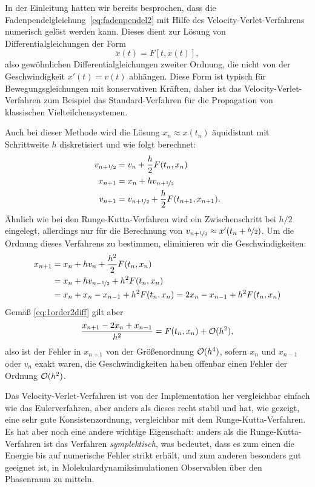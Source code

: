 In der Einleitung hatten wir bereits besprochen, dass die
Fadenpendelgleichung~\eqref{eq:fadenpendel2} mit Hilfe des
Velocity-Verlet-Verfahrens numerisch gelöst werden kann. Dieses dient
zur Lösung von Differentialgleichungen der Form
\begin{equation}
  \ddot x(t) = F[t, x(t)],
\end{equation}
also gewöhnlichen Differentialgleichungen zweiter Ordnung, die nicht
von der Geschwindigkeit $x'(t) = v(t)$ abhängen. Diese Form ist
typisch für Bewegungsgleichungen mit konservativen Kräften, daher ist
das Velocity-Verlet-Verfahren zum Beispiel das Standard-Verfahren für
die Propagation von klassischen Vielteilchensystemen.

Auch bei dieser Methode wird die Lösung $x_n\approx x(t_n)$
äquidistant mit Schrittweite $h$ diskretisiert und wie folgt
berechnet:
\begin{align}
  v_{n+\nicefrac{1}{2}} &= v_n + \frac{h}{2} F(t_n, x_n) \nonumber\\
  x_{n+1} &= x_n + h v_{n+\nicefrac{1}{2}} \\
  v_{n+1} &= v_{n+\nicefrac{1}{2}} + \frac{h}{2} F(t_{n+1}, x_{n+1}).\nonumber
\end{align}
Ähnlich wie bei den Runge-Kutta-Verfahren wird ein Zwischenschritt bei
$h/2$ eingelegt, allerdings nur für die Berechnung von
$v_{n+\nicefrac{1}{2}}\approx x'(t_n + \nicefrac{h}{2})$. Um die
Ordnung dieses Verfahrens zu bestimmen, eliminieren wir die
Geschwindigkeiten:
\begin{align}
  x_{n+1} &= x_n + h v_n + \frac{h^2}{2} F(t_n, x_n)\nonumber\\
  &=  x_n + h v_{n-\nicefrac{1}{2}} + h^2F(t_n, x_n)\nonumber\\
  &=  x_n + x_n - x_{n-1} + h^2F(t_n, x_n)
  =  2 x_n - x_{n-1} + h^2F(t_n, x_n)
\end{align}
Gemäß \eqref{eq:1order2diff} gilt aber
\begin{equation}
  \frac{x_{n+1}  - 2 x_n + x_{n-1}}{h^2} = F(t_n, x_n) + \mathcal O(h^2),
\end{equation}
also ist der Fehler in $x_{n+1}$ von der Größenordnung $\mathcal O(h^4)$,
sofern $x_n$ und $x_{n-1}$ oder $v_n$ exakt waren, die
Geschwindigkeiten haben offenbar einen Fehler der Ordnung $\mathcal O(h^2)$.

Das Velocity-Verlet-Verfahren ist von der Implementation her
vergleichbar einfach wie das Eulerverfahren, aber anders als dieses
recht stabil und hat, wie gezeigt, eine sehr gute Konsistenzordnung,
vergleichbar mit dem Runge-Kutta-Verfahren. Es hat aber noch eine
andere wichtige Eigenschaft: anders als die Runge-Kutta-Verfahren ist
das Verfahren \emph{symplektisch}, was bedeutet, dass es zum einen die
Energie bis auf numerische Fehler strikt erhält, und zum anderen
besonders gut geeignet ist, in Molekulardynamiksimulationen
Observablen über den Phasenraum zu mitteln.

